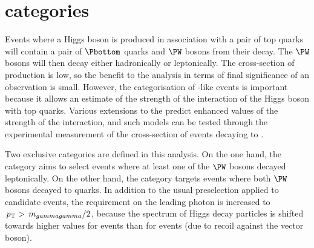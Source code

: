 %
%

\section{\TTHTag categories}
\label{cat:sec:tthtag}

Events where a Higgs boson is produced in association with a pair of top quarks will contain a pair of $\Pbottom$ quarks and $\PW$ bosons from their decay. The $\PW$ bosons will then decay either hadronically or leptonically. The cross-section of \ttH production is low, so the benefit to the analysis in terms of final significance of an observation is small. However, the categorisation of \ttH-like events is important because it allows an estimate of the strength of the interaction of the Higgs boson with top quarks. Various extensions to the \SM predict enhanced values of the strength of the \ttH interaction, and such models can be tested through the experimental measurement of the cross-section of \ttH events decaying to \Hgg.

Two exclusive \TTHTag categories are defined in this analysis. On the one hand, the \TTHLeptonicTag category aims to select \ttH events where at least one of the $\PW$ bosons decayed leptonically. On the other hand, the \TTHHadronicTag category targets events where both $\PW$ bosons decayed to quarks. In addition to the usual preselection applied to candidate events, the requirement on the leading photon \pT is increased to $\,p_\text{T}>\,m_{gammagamma}/2$, because the \pT spectrum of Higgs decay particles is shifted towards higher values for \ttH events than for \ggH events (due to recoil against the vector boson). %


